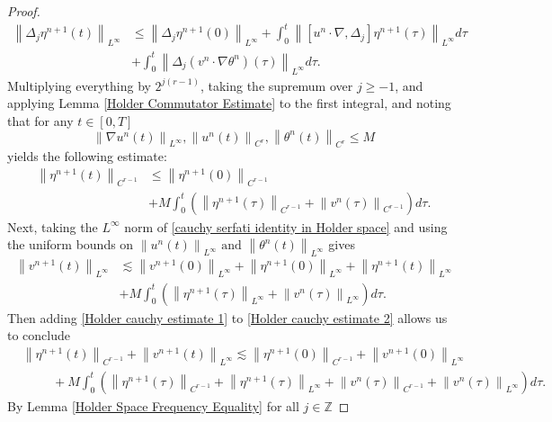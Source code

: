 \documentclass[12pt,xcolor=svgnames]{amsart}
\newcommand{\norm}[2]{\left\lVert#1\right\rVert_{#2}}
\begin{document}
\begin{proof}
\begin{align*}
\norm{\Delta_j\eta^{n+1}(t)}{L^{\infty}} &\leq \norm{\Delta_j\eta^{n+1}(0)}{L^{\infty}} +\int_0^t \norm{[u^n\cdot\nabla,\Delta_j]\eta^{n+1}(\tau)}{L^{\infty}}d\tau\\
&+
\int_0^t \norm{\Delta_j(v^n\cdot\nabla\theta^n)(\tau)}{L^{\infty}}d\tau.
\end{align*}
Multiplying everything by $2^{j(r-1)}$, taking the supremum over $j \geq -1$, and applying Lemma \ref{Holder Commutator Estimate} to the first integral, and noting that for any $t\in [0,T]$
$$
\norm{\nabla u^n(t)}{L^{\infty}}, \norm{u^n(t)}{C^r}, \norm{\theta^n(t)}{C^r} \leq M 
$$
yields the following estimate:
\begin{align}
\label{Holder cauchy estimate 1}
\norm{\eta^{n+1}(t)}{C^{r-1}} &\leq \norm{\eta^{n+1}(0)}{C^{r-1}} \nonumber \\&+ M\int_0^t \left(\norm{\eta^{n+1}(\tau)}{C^{r-1}} +\norm{v^n(\tau)}{C^{r-1}}\right)d\tau.
\end{align}
Next, taking the $L^{\infty}$ norm of \eqref{cauchy serfati identity in Holder space} and using the uniform bounds on $\norm{u^n(t)}{L^{\infty}} \text{ and } \norm{\theta^n(t)}{L^{\infty}}$ gives
\begin{align}
\label{Holder cauchy estimate 2}
\norm{v^{n+1}(t)}{L^{\infty}} &\lesssim \norm{v^{n+1}(0)}{L^{\infty}}+\norm{\eta^{n+1}(0)}{L^{\infty}}+\norm{\eta^{n+1}(t)}{L^{\infty}} \nonumber\\&+ M \int_0^t \left(\norm{\eta^{n+1}(\tau)}{L^{\infty}}+\norm{v^n(\tau)}{L^{\infty}}\right)d\tau.
\end{align}
Then adding \eqref{Holder cauchy estimate 1} to \eqref{Holder cauchy estimate 2} allows us to conclude 
\begin{align}
&\norm{\eta^{n+1}(t)}{C^{r-1}} + \norm{v^{n+1}(t)}{L^{\infty}}
\lesssim \norm{\eta^{n+1}(0)}{C^{r-1}} + \norm{v^{n+1}(0)}{L^{\infty}}\nonumber \\
&\hspace{1cm}+ M \int_0^t \left( \norm{\eta^{n+1}(\tau)}{C^{r-1}} + \norm{\eta^{n+1}(\tau)}{L^{\infty}} + \norm{v^{n}(\tau)}{C^{r-1}} + \norm{v^n(\tau)}{L^{\infty}} \right)d\tau.
\end{align}
By Lemma \ref{Holder Space Frequency Equality} for all $j \in \mathbb{Z}$ 

\end{proof}
\end{document}
